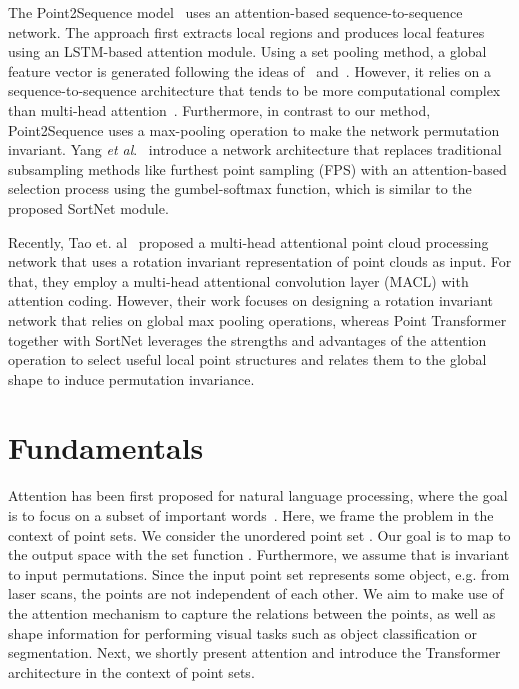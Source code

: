 \documentclass{ieeeaccess}
\begin{document}
The Point2Sequence model~\cite{liu2019point2sequence} uses an attention-based sequence-to-sequence network. The approach first extracts local regions and produces local features using an LSTM-based attention module. Using a set pooling method, a global feature vector is generated following the ideas of~\cite{zaheer2017deep} and~\cite{qi2017pointnet}. However, it relies on a sequence-to-sequence architecture that tends to be more computational complex than multi-head attention~\cite{vaswani2017attention}. Furthermore, in contrast to our method, Point2Sequence uses a max-pooling operation to make the network permutation invariant. 
Yang \textit{et al}.~\cite{yang2019modeling} introduce a network architecture that replaces traditional subsampling methods like furthest point sampling (FPS) with an attention-based selection process using the gumbel-softmax function, which is similar to the proposed SortNet module.

Recently, Tao et. al~\cite{9427563} proposed a multi-head attentional point cloud processing network that uses a rotation invariant representation of point clouds as input. For that, they employ a multi-head attentional convolution layer (MACL) with attention coding. However, their work focuses on designing a rotation invariant network that relies on global max pooling operations, whereas Point Transformer together with SortNet leverages the strengths and advantages of the attention operation to select useful local point structures and relates them to the global shape to induce permutation invariance.

\section{Fundamentals}\label{seq:03_fundamentals}
Attention has been first proposed for natural language processing, where the goal is to focus on a subset of important words~\cite{bahdanau2014neural}. Here, we frame the problem in the context of point sets. We consider the unordered point set \mbox{.} Our goal is to map  to the output space  with the set function . Furthermore, we assume that  is invariant to input permutations.
Since the input point set represents some object, e.g. from laser scans, the points are not independent of each other.
We aim to make use of the attention mechanism to capture the relations between the points, as well as shape information for performing visual tasks such as object classification or segmentation. 
Next, we shortly present attention and introduce the Transformer architecture in the context of point sets.
\end{document}
